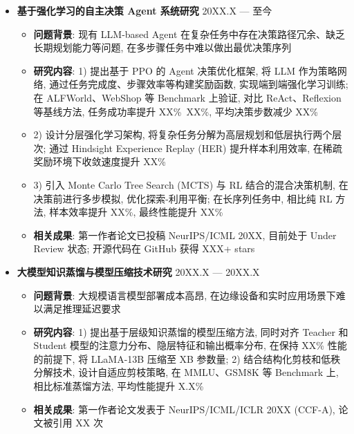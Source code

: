 \documentclass[zh]{resume}
\begin{document}
\begin{itemize}
    \item \textbf{基于强化学习的自主决策 Agent 系统研究} \hfill 20XX.X --- 至今
    \begin{itemize}
        \item \textbf{问题背景}: 现有 LLM-based Agent 在复杂任务中存在决策路径冗余、缺乏长期规划能力等问题, 在多步骤任务中难以做出最优决策序列
        \item \textbf{研究内容}: 1) 提出基于 PPO 的 Agent 决策优化框架, 将 LLM 作为策略网络, 通过任务完成度、步骤效率等构建奖励函数, 实现端到端强化学习训练; 在 ALFWorld、WebShop 等 Benchmark 上验证, 对比 ReAct、Reflexion 等基线方法, 任务成功率提升 XX\%~XX\%, 平均决策步数减少 XX\%
        \item 2) 设计分层强化学习架构, 将复杂任务分解为高层规划和低层执行两个层次; 通过 Hindsight Experience Replay (HER) 提升样本利用效率, 在稀疏奖励环境下收敛速度提升 XX\%
        \item 3) 引入 Monte Carlo Tree Search (MCTS) 与 RL 结合的混合决策机制, 在决策前进行多步模拟, 优化探索-利用平衡; 在长序列任务中, 相比纯 RL 方法, 样本效率提升 XX\%, 最终性能提升 XX\%
        \item \textbf{相关成果}: 第一作者论文已投稿 NeurIPS/ICML 20XX, 目前处于 Under Review 状态; 开源代码在 GitHub 获得 XXX+ stars
    \end{itemize}

    \item \textbf{大模型知识蒸馏与模型压缩技术研究} \hfill 20XX.X --- 20XX.X
    \begin{itemize}
        \item \textbf{问题背景}: 大规模语言模型部署成本高昂, 在边缘设备和实时应用场景下难以满足推理延迟要求
        \item \textbf{研究内容}: 1) 提出基于层级知识蒸馏的模型压缩方法, 同时对齐 Teacher 和 Student 模型的注意力分布、隐层特征和输出概率分布, 在保持 XX\% 性能的前提下, 将 LLaMA-13B 压缩至 XB 参数量; 2) 结合结构化剪枝和低秩分解技术, 设计自适应剪枝策略, 在 MMLU、GSM8K 等 Benchmark 上, 相比标准蒸馏方法, 平均性能提升 X.X\%
        \item \textbf{相关成果}: 第一作者论文发表于 NeurIPS/ICML/ICLR 20XX (CCF-A), 论文被引用 XX 次
    \end{itemize}
\end{itemize}
\end{document}
